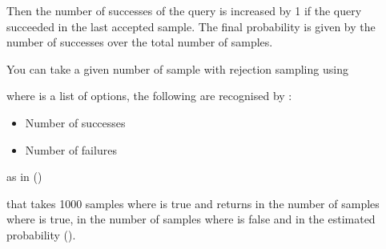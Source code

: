 \documentclass[letterpaper,10pt,english]{sphinxmanual}
\begin{document}
\sphinxAtStartPar
Then the number of successes of the query is increased by 1 if the query succeeded in the last accepted sample.
The final probability is given by the number of successes over the total number of samples.

\sphinxAtStartPar
You can take a given number of sample with rejection sampling using

\begin{sphinxVerbatim}[commandchars=\\\{\}]
  
\end{sphinxVerbatim}

\sphinxAtStartPar
where  is a list of options, the following are recognised by :
\begin{itemize}
\item {} 
\sphinxAtStartPar
{} Number of successes

\item {} 
\sphinxAtStartPar
{} Number of failures

\end{itemize}

\sphinxAtStartPar
as in ()

\begin{sphinxVerbatim}[commandchars=\\\{\}]
 \PYG{p}{[}\PYG{p}{]}
\end{sphinxVerbatim}

\sphinxAtStartPar
that takes 1000 samples where  is true and returns in  the number of samples where  is true, in  the number of samples where  is false and in  the estimated probability ().
\end{document}
